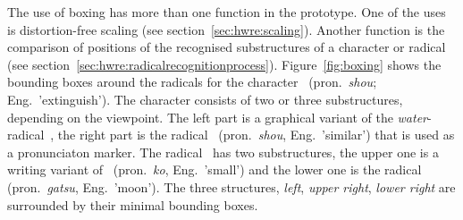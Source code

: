 The use of boxing has more than one function in the prototype. One of the uses 
is distortion-free scaling (see section~\ref{sec:hwre:scaling}). Another function
is the comparison of positions of the recognised substructures of a character 
or radical (see section~\ref{sec:hwre:radicalrecognitionprocess}).
Figure~\ref{fig:boxing} shows the bounding boxes around the radicals for
the character~ (pron.\ \emph{shou}; Eng.\ 'extinguish'). The character 
consists of two or three substructures, depending on the viewpoint. 
The left part is a graphical variant of the \emph{water}-radical~, 
the right part is the radical~ (pron.\ \emph{shou}, Eng.\ 'similar') 
that is used as a pronunciaton marker.
The radical~ has two substructures, the upper one is a writing
variant of~ (pron.\ \emph{ko}, Eng.\ 'small') and the lower one is the 
radical~ (pron.\ \emph{gatsu}, Eng.\ 'moon'). The three structures,
\emph{left}, \emph{upper right}, \emph{lower right} are surrounded by their
minimal bounding boxes.
